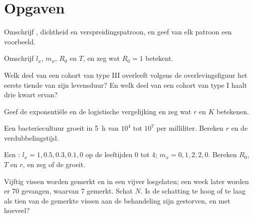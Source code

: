 \section{Opgaven}

\begin{exercise}[$\star$]\label{exo:b1:populations:1}
Omschrijf , dichtheid en verspreidingspatroon, en geef van elk
patroon een voorbeeld.
\end{exercise}

\begin{exercise}[$\star$]\label{exo:b1:populations:2}
Omschrijf $l_x$, $m_x$, $R_0$ en $T$, en zeg wat $R_0 = 1$ betekent.
\end{exercise}

\begin{exercise}[$\star$]\label{exo:b1:populations:3}
Welk deel van een cohort van type III overleeft volgens de
overlevingsfiguur het eerste tiende van zijn levensduur? En welk deel van
een cohort van type I haalt drie kwart ervan?
\end{exercise}

\begin{exercise}[$\star$]\label{exo:b1:populations:4}
Geef de exponentiële en de logistische vergelijking en zeg wat $r$ en $K$
betekenen.
\end{exercise}

\begin{exercise}[$\star\star$]\label{exo:b1:populations:5}
Een bacteriecultuur groeit in \qty{5}{h} van $10^4$ tot $10^7$  per
milliliter. Bereken $r$ en de verdubbelingstijd.
\end{exercise}

\begin{exercise}[$\star\star$]\label{exo:b1:populations:6}
Een : $l_x = 1, 0.5, 0.3, 0.1, 0$ op de leeftijden 0 tot 4;
$m_x = 0,
1, 2, 2, 0$. Bereken $R_0$, $T$ en $r$, en zeg of de  groeit.
\end{exercise}

\begin{exercise}[$\star\star$]\label{exo:b1:populations:7}
Vijftig vissen worden gemerkt en in een vijver losgelaten; een week later
worden er 70 gevangen, waarvan 7 gemerkt. Schat $N$. Is de schatting te
hoog of te laag als tien van de gemerkte vissen aan de behandeling zijn
gestorven, en met hoeveel?
\end{exercise}

